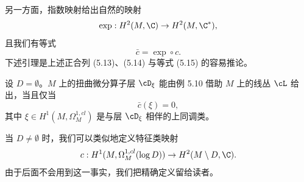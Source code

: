 

另一方面，指数映射给出自然的映射
\[
 \exp:H^2(M,\C)\to H^2(M,\C^*),
\]
且我们有等式
\begin{equation}
 \bar c=\exp\circ c. \tag{5.15}
\end{equation}
下述引理是上述正合列 (5.13)、(5.14) 与等式 (5.15) 的容易推论。

\begin{lemma}[5.11]
 设 $D=\emptyset$。$M$ 上的扭曲微分算子层 $\cD_\xi$ 能由例 5.10 借助 $M$ 上的线丛 $\cL$ 给出，当且仅当
 \[
  \bar c(\xi)=0,
 \]
 其中 $\xi\in H^1(M,\Omega^{1,cl}_M)$ 是与层 $\cD_\xi$ 相伴的上同调类。
\end{lemma}


当 $D\ne\emptyset$ 时，我们可以类似地定义特征类映射
\[
 c:H^1(M,\Omega^{1,cl}_M(\log D))\to H^2(M\setminus D,\C).
\]
由于后面不会用到这一事实，我们把精确定义留给读者。

